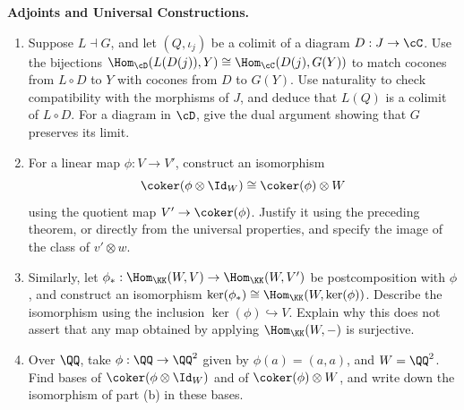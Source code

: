 \documentclass[12pt,reqno]{amsart}
\begin{document}
\begin{problems}
\item\label{t:limits} \textbf{Adjoints and Universal Constructions.}
\begin{enumerate}
\item Suppose $L\dashv G$, and let $(Q,\iota_j)$ be a colimit of a diagram $D:J\to\cC$. Use the bijections $\Hom_{\cD}(L(D(j)),Y)\cong\Hom_{\cC}(D(j),G(Y))$ to match cocones from $L\circ D$ to $Y$ with cocones from $D$ to $G(Y)$. Use naturality to check compatibility with the morphisms of $J$, and deduce that $L(Q)$ is a colimit of $L\circ D$. For a diagram in $\cD$, give the dual argument showing that $G$ preserves its limit.
\item For a linear map $\phi:V\to V'$, construct an isomorphism
\[
\coker(\phi\otimes\Id_W)\cong\coker(\phi)\otimes W
\]
using the quotient map $V'\to\coker(\phi)$. Justify it using the preceding theorem, or directly from the universal properties, and specify the image of the class of $v'\otimes w$.
\item Similarly, let $\phi_*:\Hom_{\KK}(W,V)\to\Hom_{\KK}(W,V')$ be postcomposition with $\phi$, and construct an isomorphism $\ker(\phi_*)\cong\Hom_{\KK}(W,\ker(\phi))$. Describe the isomorphism using the inclusion $\ker(\phi)\hookrightarrow V$. Explain why this  does not assert that any map obtained by applying $\Hom_{\KK}(W,-)$ is surjective.
\item Over $\QQ$, take $\phi:\QQ\to\QQ^2$ given by $\phi(a)=(a,a)$, and $W=\QQ^2$. Find bases of $\coker(\phi\otimes\Id_W)$ and of $\coker(\phi)\otimes W$, and write down the isomorphism of part (b) in these bases.
\end{enumerate}
\end{problems}

\hrulefill
\end{document}
